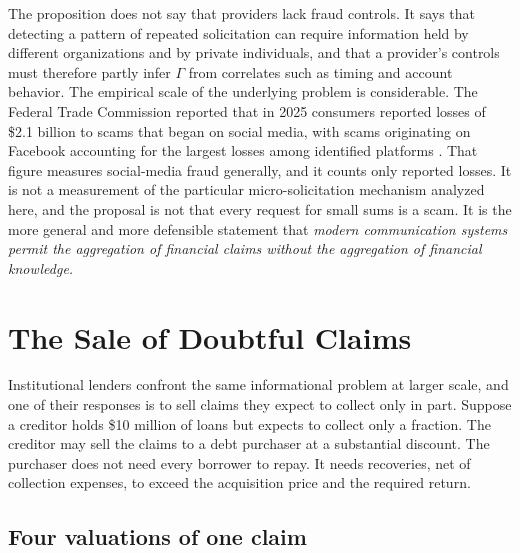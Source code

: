 \documentclass[11pt]{article}
\theoremstyle{definition}
\theoremstyle{remark}
\begin{document}
The proposition does not say that providers lack fraud controls. It says that detecting a pattern of repeated solicitation can require information held by different organizations and by private individuals, and that a provider's controls must therefore partly infer $\Gamma$ from correlates such as timing and account behavior. The empirical scale of the underlying problem is considerable. The Federal Trade Commission reported that in 2025 consumers reported losses of \$2.1 billion to scams that began on social media, with scams originating on Facebook accounting for the largest losses among identified platforms \cite{ftc2026}. That figure measures social-media fraud generally, and it counts only reported losses. It is not a measurement of the particular micro-solicitation mechanism analyzed here, and the proposal is not that every request for small sums is a scam. It is the more general and more defensible statement that \emph{modern communication systems permit the aggregation of financial claims without the aggregation of financial knowledge.}

\section{The Sale of Doubtful Claims}\label{sec:distressed}

Institutional lenders confront the same informational problem at larger scale, and one of their responses is to sell claims they expect to collect only in part. Suppose a creditor holds \$10 million of loans but expects to collect only a fraction. The creditor may sell the claims to a debt purchaser at a substantial discount. The purchaser does not need every borrower to repay. It needs recoveries, net of collection expenses, to exceed the acquisition price and the required return.

\subsection{Four valuations of one claim}
\end{document}
